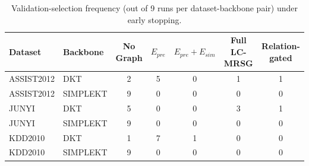 \begin{table}[h]
\centering
\caption{Validation-selection frequency (out of 9 runs per dataset-backbone pair) under early stopping.}
\label{tab:validation_selection_frequency}
\begin{tabular}{llccccc}
\toprule
Dataset & Backbone & No Graph & $E_{pre}$ & $E_{pre}+E_{sim}$ & Full LC-MRSG & Relation-gated \\
\midrule
ASSIST2012 & DKT & 2 & 5 & 0 & 1 & 1 \\
ASSIST2012 & SIMPLEKT & 9 & 0 & 0 & 0 & 0 \\
JUNYI & DKT & 5 & 0 & 0 & 3 & 1 \\
JUNYI & SIMPLEKT & 9 & 0 & 0 & 0 & 0 \\
KDD2010 & DKT & 1 & 7 & 1 & 0 & 0 \\
KDD2010 & SIMPLEKT & 9 & 0 & 0 & 0 & 0 \\
\bottomrule
\end{tabular}
\end{table}
